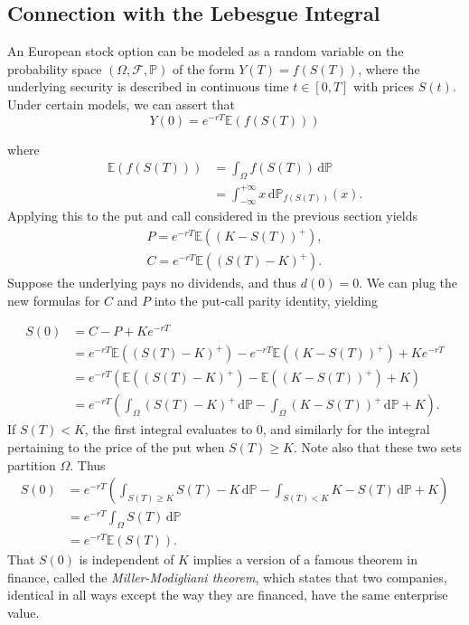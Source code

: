 \documentclass[]{article}
\newcommand{\EE}{\mathbb{E}}
\newcommand{\PP}{\mathbb{P}}
\theoremstyle{definition}
\theoremstyle{remark}
\begin{document}
\subsection{Connection with the Lebesgue Integral}
An European stock option can be modeled as a random variable on the probability space $(\Omega, \mathcal{F}, \PP)$ of the form $Y(T) = f(S(T))$, where the underlying security is described in continuous time $t\in [0,T]$ with prices $S(t)$. Under certain models\cite{capinski2004measure}, we can assert that
\begin{equation} \label{gprice}
	Y(0) = e^{-rT} \EE(f(S(T)))
\end{equation}

where
\begin{align*}
\EE(f(S(T))) &= \int_\Omega f(S(T))  \, \text{d} \PP \\
&= \int_{- \infty}^{+ \infty} x \,\text{d} \PP_{f(S(T))}(x).
\end{align*}
Applying this to the put and call considered in the previous section yields
\begin{gather*}
	P = e^{-rT} \EE((K - S(T))^+), \\
	C = e^{-rT} \EE((S(T) - K)^+).
\end{gather*}
Suppose the underlying pays no dividends, and thus $d(0)=0$. We can plug the new formulas for $C$ and $P$ into the put-call parity identity, yielding

\begin{align*}
	S(0) &= C - P + Ke^{-rT} \\
	&= e^{-rT} \EE((S(T) - K)^+) - e^{-rT} \EE((K - S(T))^+) + Ke^{-rT} \\
	&= e^{-rT}( \EE((S(T) - K)^+) -  \EE((K - S(T))^+) + K) \\
	&= e^{-rT}  
	\left( \int_\Omega (S(T) - K)^+ \, \text{d} \PP
	- \int_\Omega (K - S(T))^+ \, \text{d}  \PP + K
	\right ).
\end{align*}
If $S(T) < K$, the first integral evaluates to $0$, and similarly for the integral pertaining to the price of the put when $S(T) \geq K$. Note also that these two sets partition $\Omega$. Thus
\begin{align*}
	S(0) &= e^{-rT}
	\left(
	\int_{S(T) \geq K} S(T)-K \, \text{d} \PP
	-
	\int_{S(T) < K} K - S(T) \, \text{d} \PP + K
	\right) \\
	&= e^{-rT} \int_\Omega S(T) \, \text{d}\PP \\
	&= e^{-rT}\EE(S(T)).
\end{align*}
That $S(0)$ is independent of $K$ implies a version of a famous theorem in finance, called the \textit{Miller-Modigliani theorem}, which states that two companies, identical in all ways except the way they are financed, have the same enterprise value.\cite{capinski2004measure}
\end{document}
